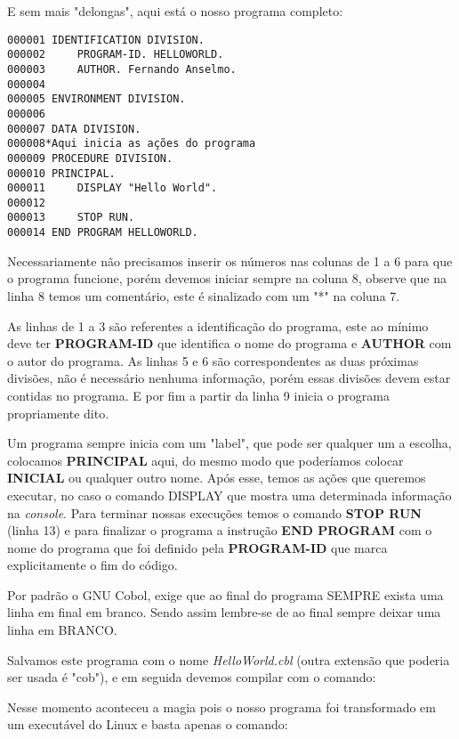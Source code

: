 E sem mais "delongas", aqui está o nosso programa completo:
\begin{lstlisting}[]
000001 IDENTIFICATION DIVISION.
000002     PROGRAM-ID. HELLOWORLD.
000003     AUTHOR. Fernando Anselmo.
000004
000005 ENVIRONMENT DIVISION.
000006       
000007 DATA DIVISION.
000008*Aqui inicia as ações do programa    
000009 PROCEDURE DIVISION.
000010 PRINCIPAL.
000011     DISPLAY "Hello World".
000012
000013     STOP RUN.
000014 END PROGRAM HELLOWORLD.

\end{lstlisting}

Necessariamente não precisamos inserir os números nas colunas de 1 a 6 para que o programa funcione, porém devemos iniciar sempre na coluna 8, observe que na linha 8 temos um comentário, este é sinalizado com um "*" na coluna 7.

As linhas de 1 a 3 são referentes a identificação do programa, este ao mínimo deve ter \textbf{PROGRAM-ID} que identifica o nome do programa e \textbf{AUTHOR} com o autor do programa. As linhas 5 e 6 são correspondentes as duas próximas divisões, não é necessário nenhuma informação, porém essas divisões devem estar contidas no programa. E por fim a partir da linha 9 inicia o programa propriamente dito.

Um programa sempre inicia com um "label", que pode ser qualquer um a escolha, colocamos \textbf{PRINCIPAL} aqui, do mesmo modo que poderíamos colocar \textbf{INICIAL} ou qualquer outro nome. Após esse, temos as ações que queremos executar, no caso o comando DISPLAY que mostra uma determinada informação na \textit{console}. Para terminar nossas execuções temos o comando \textbf{STOP RUN} (linha 13) e para finalizar o programa a instrução \textbf{END PROGRAM} com o nome do programa que foi definido pela \textbf{PROGRAM-ID} que marca explicitamente o fim do código.

\begin{note}
	Por padrão o GNU Cobol, exige que ao final do programa SEMPRE exista uma linha em final em branco. Sendo assim lembre-se de ao final sempre deixar uma linha em BRANCO.
\end{note}

Salvamos este programa com o nome \textit{HelloWorld.cbl} (outra extensão que poderia ser usada é "cob"), e em seguida devemos compilar com o comando: \\

Nesse momento aconteceu a magia pois o nosso programa foi transformado em um executável do Linux e basta apenas o comando: \\


